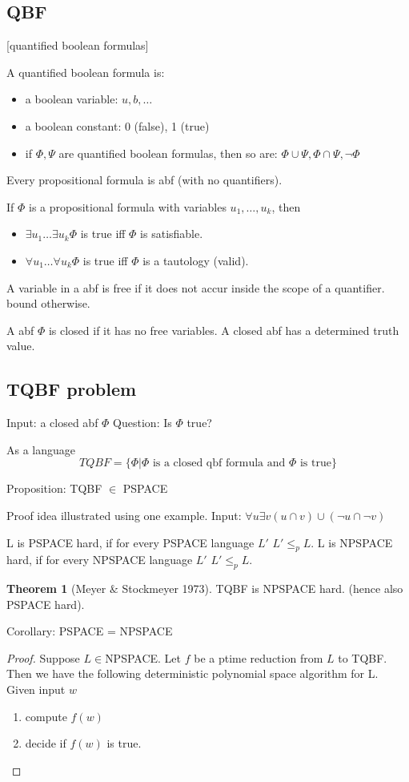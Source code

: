 \documentclass[a4paper,12pt]{article}
\theoremstyle{definition}
\newtheorem{theorem}[counter]{Theorem}
\theoremstyle{remark}
\begin{document}
\subsection{QBF}[quantified boolean formulas]

A quantified boolean formula is:
\begin{itemize}
    \item a boolean variable: $u, b, \dots$
    \item a boolean constant: 0 (false), 1 (true)
    \item if $\Phi, \Psi$ are quantified boolean formulas, then so are: $\Phi \cup \Psi, \Phi \cap \Psi, \neg \Phi$
\end{itemize}

Every propositional formula is abf (with no quantifiers).

If $\Phi$ is a propositional formula with variables $u_1, \dots, u_k$, then 
\begin{itemize}
    \item $\exists u_1 \dots \exists u_k \Phi$ is true iff $\Phi$ is satisfiable.
    \item $\forall u_1 \dots \forall u_k \Phi$ is true iff $\Phi$ is a tautology (valid).
\end{itemize}

A variable in a abf is free if it does not accur inside the scope of a quantifier.
bound otherwise.

A abf $\Phi$ is closed if it has no free variables.
A closed abf has a determined truth value.

\subsection{TQBF problem}
Input: a closed abf $\Phi$
Question: Is $\Phi$ true?

As a language
\begin{equation*}
    TQBF = \{\Phi | \Phi \text{ is a closed qbf formula and } \Phi \text{ is true}\}
\end{equation*}

Proposition: TQBF $\in$ PSPACE

Proof idea illustrated using one example.
Input: $\forall u \exists v (u \cap v) \cup (\neg u \cap \neg v)$


L is PSPACE hard, if for every PSPACE language $L'$ $L' \leq_p L$.
L is NPSPACE hard, if for every NPSPACE language $L'$ $L' \leq_p L$.

\begin{theorem}[Meyer $\&$ Stockmeyer 1973]
    TQBF is NPSPACE hard. (hence also PSPACE hard).
\end{theorem}
Corollary: PSPACE = NPSPACE
\begin{proof}
    Suppose $L \in $NPSPACE. Let $f$ be a ptime reduction from $L$ to TQBF. Then we have the following deterministic polynomial space algorithm
    for L. Given input $w$
    \begin{enumerate}
        \item compute $f(w)$
        \item decide if $f(w)$ is true.
    \end{enumerate}
\end{proof}
\end{document}
